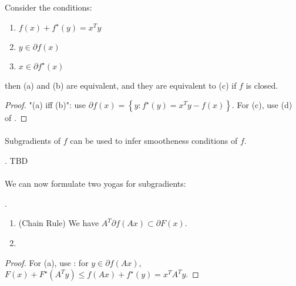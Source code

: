 \begin{prop}\label{prop:046-subgrad-conjugate}
	Consider the conditions:
	\begin{enumerate}[label=(\alph*)]
		\item $f(x) + f^\star(y) = x^Ty$
		\item $y\in \partial f(x)$
		\item $x\in \partial f^\star(x)$
	\end{enumerate}
	then (a) and (b) are equivalent, and they are equivalent to (c) if $f$ is closed.
\end{prop}

\begin{proof}
	"(a) iff (b)": use $\partial f(x) = \left\{y:f^\star(y)=x^Ty-f(x)\right\}$. For (c), use (d) of .
\end{proof}

\paragraph{}Subgradients of $f$ can be used to infer smootheness conditions of $f$.

\begin{prop}\label{prop:046-subgradients-and-smoothness}.
	TBD
\end{prop}

\paragraph{}We can now formulate two yogas for subgradients:

\begin{prop}\label{prop:046-yoga-subgradients}.
	\begin{enumerate}[label=(\alph*)]
		\item (Chain Rule) We have $A^T\partial f(Ax)\subset \partial F(x)$.
		\item
	\end{enumerate}
\end{prop}

\begin{proof}
	For (a), use : for $y\in \partial f(Ax)$, $F(x)+F^\star(A^Ty)\leq f(Ax)+f^\star(y)=x^TA^Ty$.
\end{proof}

